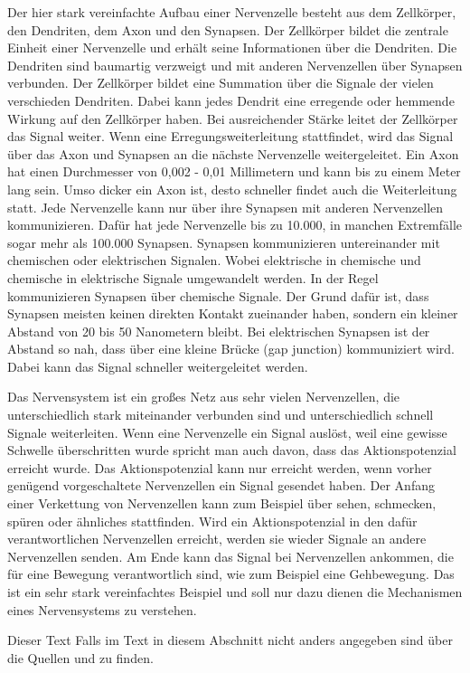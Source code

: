 Der hier stark vereinfachte Aufbau einer Nervenzelle besteht aus dem Zellkörper, den Dendriten, dem Axon und den Synapsen. Der Zellkörper bildet die zentrale Einheit einer Nervenzelle und erhält seine Informationen über die Dendriten. Die Dendriten sind baumartig verzweigt und mit anderen Nervenzellen über Synapsen verbunden. Der Zellkörper bildet eine Summation über die Signale der vielen verschieden Dendriten. Dabei kann jedes Dendrit eine erregende oder hemmende Wirkung auf den Zellkörper haben. Bei ausreichender Stärke leitet der Zellkörper das Signal weiter. Wenn eine Erregungsweiterleitung stattfindet, wird das Signal über das Axon und Synapsen an die nächste Nervenzelle weitergeleitet. Ein Axon hat einen Durchmesser von 0,002 - 0,01 Millimetern und kann bis zu einem Meter lang sein. Umso dicker ein Axon ist, desto schneller findet auch die Weiterleitung statt. Jede Nervenzelle kann nur über ihre Synapsen mit anderen Nervenzellen kommunizieren. Dafür hat jede Nervenzelle bis zu 10.000, in manchen Extremfälle sogar mehr als 100.000 Synapsen. Synapsen kommunizieren untereinander mit chemischen oder elektrischen Signalen. Wobei elektrische in chemische und chemische in elektrische Signale umgewandelt werden. In der Regel kommunizieren Synapsen über chemische Signale. Der Grund dafür ist, dass Synapsen meisten keinen direkten Kontakt zueinander haben, sondern ein kleiner Abstand von 20 bis 50 Nanometern bleibt. Bei elektrischen Synapsen ist der Abstand so nah, dass über eine kleine Brücke (gap junction) kommuniziert wird. Dabei kann das Signal schneller weitergeleitet werden.

Das Nervensystem ist ein großes Netz aus sehr vielen Nervenzellen, die unterschiedlich stark miteinander verbunden sind und unterschiedlich schnell Signale weiterleiten. Wenn eine Nervenzelle ein Signal auslöst, weil eine gewisse Schwelle überschritten wurde spricht man auch davon, dass das Aktionspotenzial erreicht wurde. Das Aktionspotenzial kann nur erreicht werden, wenn vorher genügend vorgeschaltete Nervenzellen ein Signal gesendet haben. Der Anfang einer Verkettung von Nervenzellen kann zum Beispiel über sehen, schmecken, spüren oder ähnliches stattfinden. Wird ein Aktionspotenzial in den dafür verantwortlichen Nervenzellen erreicht, werden sie wieder Signale an andere Nervenzellen senden. Am Ende kann das Signal bei Nervenzellen ankommen, die für eine Bewegung verantwortlich sind, wie zum Beispiel eine Gehbewegung. Das ist ein sehr stark vereinfachtes Beispiel und soll nur dazu dienen die Mechanismen eines Nervensystems zu verstehen.

Dieser Text Falls im Text in diesem Abschnitt nicht anders angegeben sind über die Quellen \cite{dasgehirn.info} und \cite{gehirnlernen.de} zu finden.